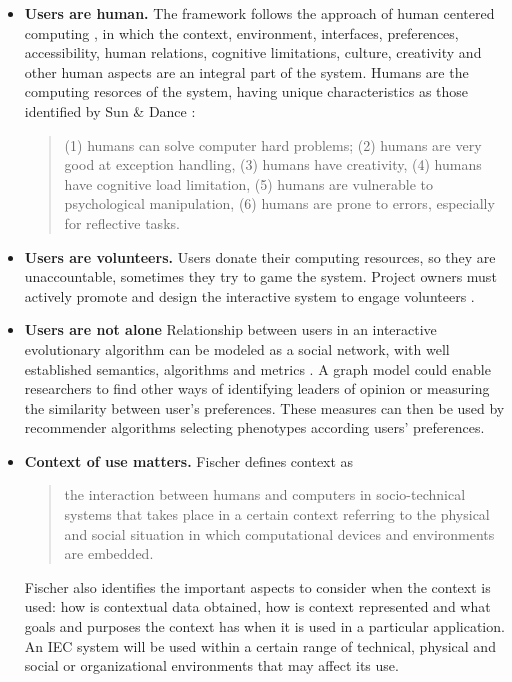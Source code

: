 \begin{itemize}
\item {\bf Users are human.} 
  The framework follows the approach of human centered computing \cite{sebe2010human},
  in which the context, environment, interfaces, preferences, accessibility, human relations,
  cognitive limitations, culture, creativity and other human aspects are an integral part 
  of the system. Humans are the computing resorces of the system, having unique characteristics
  as those identified by Sun \& Dance \cite{Sun2013}:
\begin{quote}
  (1) humans can solve computer hard problems; (2) humans are very good at exception handling,
  (3) humans have creativity, (4) humans have cognitive load limitation, (5) humans are
  vulnerable to psychological manipulation, (6) humans are prone to errors,
  especially for reflective tasks.
\end{quote}  


\item {\bf Users are volunteers.} Users donate their computing resources, so they are 
unaccountable, sometimes they try to game the system. Project owners must actively promote and
design the interactive system to engage volunteers \cite{oh2015clicking}. %
\item {\bf Users are not alone}
  Relationship between users in an interactive evolutionary algorithm can be modeled
  as a social network, with well established semantics, algorithms and metrics 
  \cite{ahuja1993network}.
  A graph model could enable researchers to find other ways of identifying leaders of 
  opinion or measuring the similarity between user's preferences. 
  These measures can then be used by recommender algorithms selecting 
  phenotypes according users' preferences. 

\item {\bf Context of use matters.}
  Fischer \cite{fischer2012context}
  defines context as
  \begin{quote}
  the interaction between humans and
  computers in socio-technical systems that takes place in a certain
  context referring to the physical and social situation in which
  computational devices and environments are embedded.
\end{quote}   
  Fischer also identifies the important aspects to consider when the context is used: how is
  contextual data obtained, how is context represented and what
  goals and purposes the context has when it is used in a particular
  application. An IEC system will  be used within a certain range 
  of technical, physical and social or
  organizational environments \cite{maguire2001context} that may affect its use.
 

\end{itemize}
